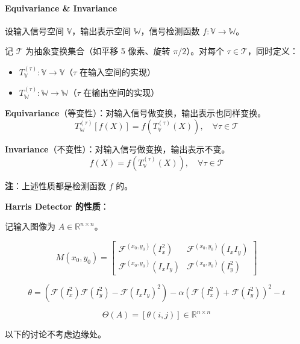 \paragraph{Equivariance \& Invariance}\label{equivariance-invariance}

设输入信号空间 \(\mathbb{V}\)，输出表示空间 \(\mathbb{W}\)，信号检测函数
\(f: \mathbb{V} \rightarrow \mathbb{W}\)。

记 \(\mathcal{T}\) 为抽象变换集合（如平移 5 像素、旋转
\(\pi/2\)）。对每个 \(\tau \in \mathcal{T}\)，同时定义：

\begin{itemize}
\tightlist
\item
  \(T_{\mathbb{V}}^{(\tau)}: \mathbb{V} \rightarrow \mathbb{V}\)（\(\tau\)
  在输入空间的实现）
\item
  \(T_{\mathbb{W}}^{(\tau)}: \mathbb{W} \rightarrow \mathbb{W}\)（\(\tau\)
  在输出空间的实现）
\end{itemize}

\textbf{Equivariance}（等变性）：对输入信号做变换，输出表示也同样变换。
\[
T_{\mathbb{W}}^{(\tau)}[f(X)] = f(T_{\mathbb{V}}^{(\tau)}(X)), \quad \forall \tau \in \mathcal{T}
\]

\textbf{Invariance}（不变性）：对输入信号做变换，输出表示不变。 \[
f(X) = f(T_{\mathbb{V}}^{(\tau)}(X)), \quad \forall \tau \in \mathcal{T}
\]

\textbf{注}：上述性质都是检测函数 \(f\) 的。

\textbf{Harris Detector 的性质}：

记输入图像为 \(A \in \mathbb{R}^{n \times n}\)。

\[
M(x_0,y_0)
=
\begin{bmatrix}
\mathcal{F}^{(x_0, y_0)}(I_x^2) & \mathcal{F}^{(x_0, y_0)}(I_x I_y) \\
\mathcal{F}^{(x_0, y_0)}(I_x I_y) & \mathcal{F}^{(x_0, y_0)}(I_y^2)
\end{bmatrix}
\]

\[
\theta
= (\mathcal{F}(I_x^2) \mathcal{F}(I_y^2) - \mathcal{F}(I_x I_y)^2)
- \alpha (\mathcal{F}(I_x^2) + \mathcal{F}(I_y^2))^2 - t
\]

\[
\Theta(A) = [\theta(i, j)] \in \mathbb{R}^{n \times n}
\]

以下的讨论不考虑边缘处。


